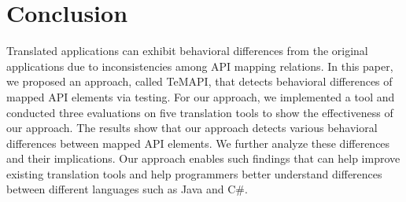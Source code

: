 \section{Conclusion}
\label{sec:conclusion}

Translated applications can exhibit behavioral differences from the original applications due to inconsistencies among API mapping relations. In this paper, we proposed an approach, called TeMAPI, that detects behavioral differences of mapped API elements via testing. For our approach, we implemented a tool and conducted three evaluations on five translation tools to show the effectiveness of our approach. The results show that our approach detects various behavioral differences between mapped API elements. We further analyze these differences and their implications. Our approach enables such findings that can help improve existing translation tools and help programmers better understand differences between different languages such as Java and C\#.

